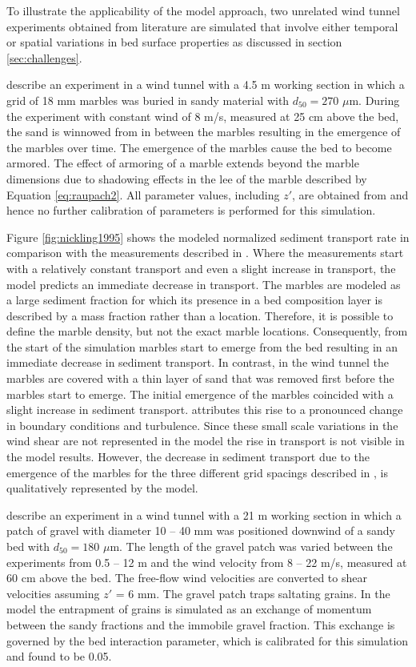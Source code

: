 To illustrate the applicability of the model approach, two unrelated
wind tunnel experiments obtained from literature are simulated that
involve either temporal \citep{Nickling1995} or spatial
\citep{Dong2004b} variations in bed surface properties as discussed in
section \ref{sec:challenges}.

\citet{Nickling1995} describe an experiment in a wind tunnel with a
4.5 m working section in which a grid of 18 mm marbles was buried in
sandy material with $d_{50} = 270$ $\mu \mathrm{m}$.  During the
experiment with constant wind of 8 m/s, measured at 25 cm above the
bed, the sand is winnowed from in between the marbles resulting in the
emergence of the marbles over time. The emergence of the marbles cause
the bed to become armored. The effect of armoring of a marble extends
beyond the marble dimensions due to shadowing effects in the lee of
the marble described by Equation \ref{eq:raupach2}. All parameter
values, including $z'$, are obtained from \citet{Nickling1995} and
hence no further calibration of parameters is performed for this
simulation.

Figure \ref{fig:nickling1995} shows the modeled normalized sediment
transport rate in comparison with the measurements described in
\citet{Nickling1995}. Where the measurements start with a relatively
constant transport and even a slight increase in transport, the model
predicts an immediate decrease in transport. The marbles are modeled
as a large sediment fraction for which its presence in a bed
composition layer is described by a mass fraction rather than a
location. Therefore, it is possible to define the marble density, but
not the exact marble locations. Consequently, from the start of the
simulation marbles start to emerge from the bed resulting in an
immediate decrease in sediment transport. In contrast, in the wind
tunnel the marbles are covered with a thin layer of sand that was
removed first before the marbles start to emerge. The initial
emergence of the marbles coincided with a slight increase in sediment
transport. \citet{Nickling1995} attributes this rise to a pronounced
change in boundary conditions and turbulence. Since these small scale
variations in the wind shear are not represented in the model the rise
in transport is not visible in the model results. However, the
decrease in sediment transport due to the emergence of the marbles for
the three different grid spacings described in \citet{Nickling1995},
is qualitatively represented by the model.

\citet{Dong2004b} describe an experiment in a wind tunnel with a 21 m
working section in which a patch of gravel with diameter 10 -- 40 mm
was positioned downwind of a sandy bed with $d_{50} = 180$
$\mu \mathrm{m}$. The length of the gravel patch was varied between
the experiments from 0.5 -- 12 m and the wind velocity from 8 -- 22
m/s, measured at 60 cm above the bed. The free-flow wind velocities
are converted to shear velocities assuming $z'$ = 6 mm. The gravel
patch traps saltating grains. In the model the entrapment of grains is
simulated as an exchange of momentum between the sandy fractions and
the immobile gravel fraction. This exchange is governed by the bed
interaction parameter, which is calibrated for this simulation and
found to be 0.05.

